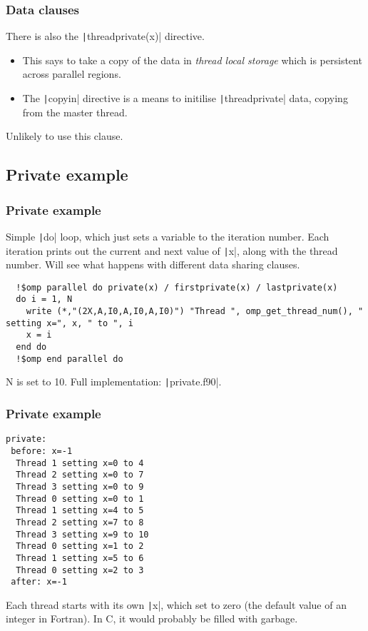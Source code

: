 \documentclass{beamer}
\begin{document}
\begin{frame}
\frametitle{Data clauses}
There is also the \texttt|threadprivate(x)| directive.
\begin{itemize}
  \item This says to take a copy of the data in \emph{thread local storage} which is persistent across parallel regions.
  \item The \texttt|copyin| directive is a means to initilise \texttt|threadprivate| data, copying from the master thread.
\end{itemize}

Unlikely to use this clause.
\end{frame}

\subsection{Private example}
\begin{frame}[fragile]
\frametitle{Private example}
Simple \texttt|do| loop, which just sets a variable to the iteration number.
Each iteration prints out the current and next value of \texttt|x|, along with the thread number.
Will see what happens with different data sharing clauses.

\begin{verbatim}
  !$omp parallel do private(x) / firstprivate(x) / lastprivate(x)
  do i = 1, N
    write (*,"(2X,A,I0,A,I0,A,I0)") "Thread ", omp_get_thread_num(), " setting x=", x, " to ", i
    x = i
  end do
  !$omp end parallel do
\end{verbatim}
N is set to 10.
Full implementation: \texttt|private.f90|.
\end{frame}

\begin{frame}[fragile]
\frametitle{Private example}
\begin{verbatim}
private:
 before: x=-1
  Thread 1 setting x=0 to 4
  Thread 2 setting x=0 to 7
  Thread 3 setting x=0 to 9
  Thread 0 setting x=0 to 1
  Thread 1 setting x=4 to 5
  Thread 2 setting x=7 to 8
  Thread 3 setting x=9 to 10
  Thread 0 setting x=1 to 2
  Thread 1 setting x=5 to 6
  Thread 0 setting x=2 to 3
 after: x=-1
\end{verbatim}
Each thread starts with its own \texttt|x|, which set to zero (the default value of an integer in Fortran).
In C, it would probably be filled with garbage.
\end{frame}
\end{document}
